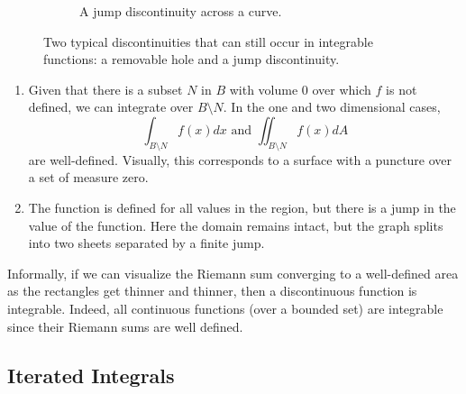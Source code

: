 \begin{figure}[H]
\begin{subfigure}[b]{0.48\textwidth}
      \caption{A jump discontinuity across a curve.}
    \end{subfigure}
    \caption{Two typical discontinuities that can still occur in integrable functions: a removable hole and a jump discontinuity.}
  \end{figure}

  \begin{enumerate}
    \item Given that there is a subset $N$ in $B$ with volume $0$ over which $f$ is not defined, we can integrate over $B \setminus N$. In the one and two dimensional cases, 
    \[\int_{B \setminus N} f(x) dx \text{ and } \iint_{B\setminus N} f(x) dA\]
    are well-defined. Visually, this corresponds to a surface with a puncture over a set of measure zero. 
    \item The function is defined for all values in the region, but there is a jump in the value of the function. 
    Here the domain remains intact, but the graph splits into two sheets separated by a finite jump. 
  \end{enumerate}
  Informally, if we can visualize the Riemann sum converging to a well-defined area as the rectangles get thinner and thinner, then a discontinuous function is integrable. Indeed, all continuous functions (over a bounded set) are integrable since their Riemann sums are well defined. 

\subsection{Iterated Integrals} 

